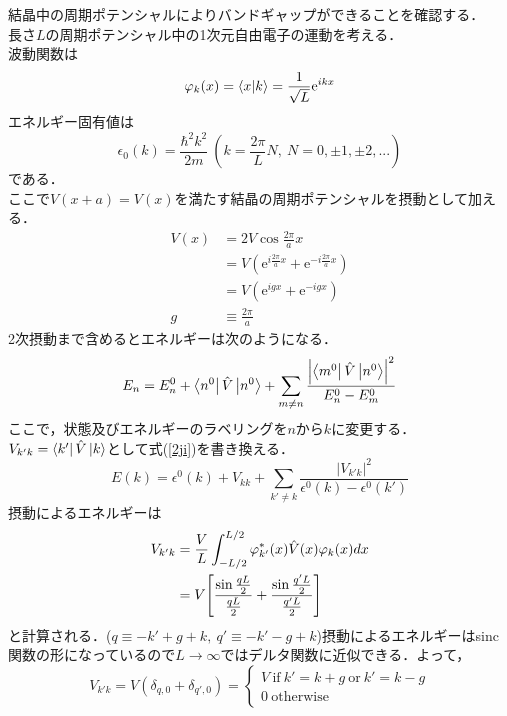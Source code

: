 \documentclass{standalone}
\begin{document}
  結晶中の周期ポテンシャルによりバンドギャップができることを確認する．\\
  長さ$L$の周期ポテンシャル中の1次元自由電子の運動を考える．\\
  波動関数は
  \begin{equation}
    \varphi_k(x)=\braket{x}{k}=\frac{1}{\sqrt{L}}\mathrm{e}^{ikx}
  \end{equation}
  エネルギー固有値は
  \begin{equation}
    \epsilon_0(k)=\frac{\hbar^2k^2}{2m}\ (k=\frac{2\pi}{L}N,\ N=0,\pm1,\pm2,...)
  \end{equation}
  である．\\
  ここで$V(x+a)=V(x)$を満たす結晶の周期ポテンシャルを摂動として加える．
  \begin{align}
    V(x)&=2V\cos\frac{2\pi}{a}x\\
    &=V(\mathrm{e}^{i\frac{2\pi}{a}x}+\mathrm{e}^{-i\frac{2\pi}{a}x})\\
    &=V(\mathrm{e}^{igx}+\mathrm{e}^{-igx})\\
    g&\equiv\frac{2\pi}{a}
  \end{align}
  2次摂動まで含めるとエネルギーは次のようになる．
  \begin{equation}
    \label{2ji}
    E_n=E_n^0+\bra{n^0}\hat{V}\ket{n^0}+\sum_{m\ne n}\frac{\qty|\bra{m^0}\hat{V}\ket{n^0}|^2}{E_n^0-E_m^0}
  \end{equation}
  ここで，状態及びエネルギーのラベリングを$n$から$k$に変更する．$V_{k'k}=\bra{k'}\hat{V}\ket{k}$として式(\ref{2ji})を書き換える．
  \begin{equation}
    E(k)=\epsilon^0(k)+V_{kk}+\sum_{k'\ne k}\frac{|V_{k'k}|^2}{\epsilon^0(k)-\epsilon^0(k')}
  \end{equation}
  摂動によるエネルギーは
  \begin{align}
    V_{k'k}&=\frac{V}{L}\int_{-L/2}^{L/2}\varphi_{k'}^{*}(x)\hat{V}(x)\varphi_k(x)dx\\
    &=V\qty[\frac{\sin\frac{qL}{2}}{\frac{qL}{2}}+\frac{\sin\frac{q'L}{2}}{\frac{q'L}{2}}]\\
  \end{align}
  と計算される．($q\equiv -k'+g+k,\ q'\equiv -k'-g+k$)摂動によるエネルギーはsinc関数の形になっているので$L\to\infty$ではデルタ関数に近似できる．よって，
  \begin{equation}
    V_{k'k}=V(\delta_{q,0}+\delta_{q',0})=
    \begin{cases}
      V\ \mathrm{if}\ k'=k+g\ \mathrm{or}\ k'=k-g\\
      0\ \mathrm{otherwise}
    \end{cases}
  \end{equation}
\end{document}
